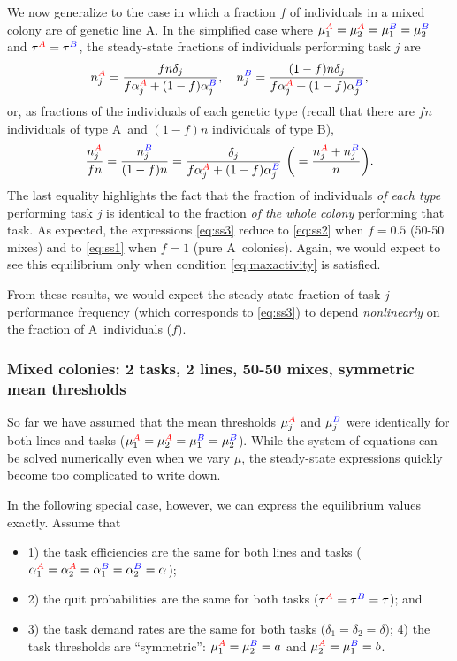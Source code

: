\documentclass[11pt]{article}
\newcommand{\A}{{\color{red}A}}
\newcommand{\B}{{\color{blue}B}}
\begin{document}
\begin{appendices}
We now generalize to the case in which a fraction $f$ of individuals in a mixed colony are of genetic line \A. In the simplified case where $\mu_1^{\A} = \mu_2^{\A} = \mu_1^{\B} = \mu_2^{\B}$ and $\tau^{\A} = \tau^{\B}$, the steady-state fractions of individuals performing task $j$ are
\begin{equation}
     n_j^{\A} =  \frac{fn\delta_j}{f\alpha_j^{\A} + (1-f)\alpha_j^{\B}}, 
     \quad
     n_j^{\B} =  \frac{(1-f)n\delta_j}{f\alpha_j^{\A} + (1-f)\alpha_j^{\B}}, 
     \label{eq:ss3a}
\end{equation}
or, as fractions of the individuals of each genetic type (recall that there are $fn$ individuals of type \A\ and $(1-f)n$ individuals of type \B),
\begin{equation}
     \frac{n_j^{\A}}{fn} =  \frac{n_j^{\B}}{(1-f)n} = \frac{\delta_j}{f\alpha_j^{\A} + (1-f)\alpha_j^{\B}} \ \bigg(= \frac{n_j^{\A} + n_j^{\B}}{n}\bigg). \label{eq:ss3}
\end{equation}
The last equality highlights the fact that the fraction of individuals \textit{of each type} performing task $j$ is identical to the fraction \textit{of the whole colony} performing that task. As expected, the expressions \eqref{eq:ss3} reduce to \eqref{eq:ss2} when $f=0.5$ (50-50 mixes) and to \eqref{eq:ss1} when $f=1$ (pure \A\ colonies). Again, we would expect to see this equilibrium only when condition \eqref{eq:maxactivity} is satisfied. 

From these results, we would expect the steady-state fraction of task $j$ performance frequency (which corresponds to \eqref{eq:ss3}) to depend \textit{nonlinearly} on the fraction of \A\ individuals ($f$). 
\subsubsection{Mixed colonies: 2 tasks, 2 lines, 50-50 mixes, symmetric mean thresholds}

So far we have assumed that the mean thresholds $\mu_{j}^{\A}$ and $\mu_{j}^{\B}$ were identically for both lines and tasks ($\mu_{1}^{\A} = \mu_{2}^{\A} = \mu_{1}^{\B} = \mu_{2}^{\B}$). While the system of equations can be solved numerically even when we vary $\mu$, the steady-state expressions quickly become too complicated to write down.

In the following special case, however, we can express the equilibrium values exactly. Assume that 
\begin{itemize}
    \item 1) the task efficiencies are the same for both lines and tasks ($\alpha_{1}^{\A} = \alpha_{2}^{\A} = \alpha_{1}^{\B} = \alpha_{2}^{\B} = \alpha$);
    \item 2) the quit probabilities are the same for both tasks ($\tau^{\A} = \tau^{\B} = \tau$); and
    \item 3) the task demand rates are the same for both tasks ($\delta_1 = \delta_2  = \delta$); 4) the task thresholds are ``symmetric'': $\mu_{1}^{\A} = \mu_{2}^{\B} = a$ and $\mu_{2}^{\A} = \mu_{1}^{\B} = b$. 
\end{itemize}


\end{appendices}
\end{document}
